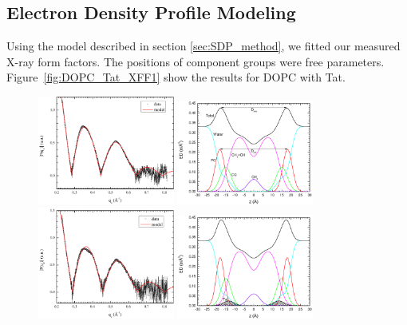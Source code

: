 \subsection{Electron Density Profile Modeling}\label{sec:SDP_results}
Using the model described in section \ref{sec:SDP_method}, 
we fitted our measured X-ray form factors. 
The positions of component groups were free parameters. 
Figure~\ref{fig:DOPC_Tat_XFF1} show the results for DOPC with Tat. 
\begin{figure}[htbp]
  \centering
  \includegraphics[width=0.4\textwidth]{figures/Tat/SDP_Results/XFF/DOPC_XFF1}
  \includegraphics[width=0.4\textwidth]{figures/Tat/SDP_Results/EDP/DOPC_EDP1}
  \includegraphics[width=0.4\textwidth]{figures/Tat/SDP_Results/XFF/DOPC_Tat_62to1_3p0_XFF1}
  \includegraphics[width=0.4\textwidth]{figures/Tat/SDP_Results/EDP/DOPC_Tat_62to1_3p0_EDP1}

\end{figure}
